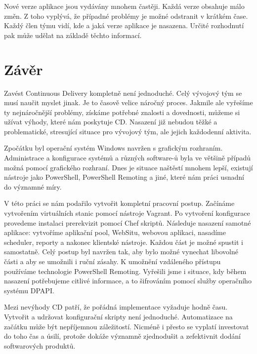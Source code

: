 Nové verze aplikace jsou vydávány mnohem častěji. Každá verze obsahuje málo změn. Z toho vyplývá, že případné problémy je možné odstranit v krátkém čase. Každý člen týmu vidí, kde a jaká verze aplikace je nasazena. Určité rozhodnutí pak může udělat na základě těchto informací. 

\chapter{Závěr}
\label{ch:zaver}
Zavést Continuous Delivery kompletně není jednoduché. Celý vývojový tým se musí naučit myslet jinak. Je to časově velice náročný proces. Jakmile ale vyřešíme ty nejnáročnější problémy, získáme potřebné znalosti a dovednosti, můžeme si užívat výhody, které nám poskytuje CD. Nasazení již nebudou těžké a problematické, stresující situace pro vývojový tým, ale jejich každodenní aktivita. 

Zpočátku byl operační systém Windows navržen s grafickým rozhraním. Administrace a konfigurace systémů a různých software-ů byla ve většině případů možná pomocí grafického rozhraní. Dnes je situace naštěstí mnohem lepší, existují nástroje jako PowerShell, PowerShell Remoting a jiné, které nám práci usnadní do významné míry. 

V této práci se nám podařilo vytvořit kompletní pracovní postup. Začínáme vytvořením virtuálních stanic pomocí nástroje Vagrant. Po vytvoření konfigurace provedeme instalaci prerekvizit pomocí Chef skriptů. Následuje nasazení samotné aplikace: vytvoříme aplikační pool, WebSitu, webovou aplikaci, nasadíme scheduler, reporty a nakonec klientské nástroje. Každou část je možné spustit i samostatně. Celý postup byl navržen tak, aby bylo možné vynechat libovolné části a aby se umožnili i ruční zásahy. K umožnění vzdáleného přístupu používáme technologie PowerShell Remoting. Vyřešili jsme i situace, kdy během nasazení potřebujeme citlivé informace, a to šifrováním pomocí služby operačního systému DPAPI.

Mezi nevýhody CD patří, že pořádná implementace vyžaduje hodně času. Vytvořit a udržovat konfigurační skripty není jednoduché. Automatizace na začátku může být nepříjemnou záležitostí. Nicméně i přesto se vyplatí investovat do toho čas a úsilí, protože dokáže významně zjednodušit a zefektivnit dodání softwarových produktů.

